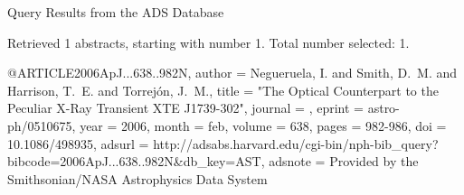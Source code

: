 Query Results from the ADS Database


Retrieved 1 abstracts, starting with number 1.  Total number selected: 1.

@ARTICLE{2006ApJ...638..982N,
   author = {{Negueruela}, I. and {Smith}, D.~M. and {Harrison}, T.~E. and 
	{Torrej{\'o}n}, J.~M.},
    title = "{The Optical Counterpart to the Peculiar X-Ray Transient XTE J1739-302}",
  journal = {\apj},
   eprint = {astro-ph/0510675},
     year = 2006,
    month = feb,
   volume = 638,
    pages = {982-986},
      doi = {10.1086/498935},
   adsurl = {http://adsabs.harvard.edu/cgi-bin/nph-bib_query?bibcode=2006ApJ...638..982N&db_key=AST},
  adsnote = {Provided by the Smithsonian/NASA Astrophysics Data System}
}



